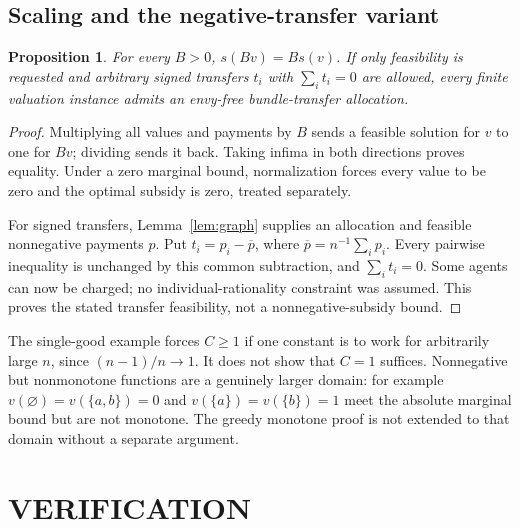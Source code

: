 \documentclass[11pt,a4paper]{article}
\newtheorem{proposition}[theorem]{Proposition}
\theoremstyle{remark}\newtheorem{remark}[theorem]{Remark}
\begin{document}
\subsection{Scaling and the negative-transfer variant}
\begin{proposition}\label{prop:scale}
For every $B>0$, $s(Bv)=B s(v)$. If only feasibility is requested and arbitrary signed transfers $t_i$ with $\sum_i t_i=0$ are allowed, every finite valuation instance admits an envy-free bundle-transfer allocation.
\end{proposition}
\begin{proof}
Multiplying all values and payments by $B$ sends a feasible solution for $v$ to one for $Bv$; dividing sends it back. Taking infima in both directions proves equality. Under a zero marginal bound, normalization forces every value to be zero and the optimal subsidy is zero, treated separately.

For signed transfers, Lemma~\ref{lem:graph} supplies an allocation and feasible nonnegative payments $p$. Put $t_i=p_i-\overline p$, where $\overline p=n^{-1}\sum_i p_i$. Every pairwise inequality is unchanged by this common subtraction, and $\sum_i t_i=0$. Some agents can now be charged; no individual-rationality constraint was assumed. This proves the stated transfer feasibility, not a nonnegative-subsidy bound.
\end{proof}
The single-good example forces $C\ge1$ if one constant is to work for arbitrarily large $n$, since $(n-1)/n\to1$. It does not show that $C=1$ suffices. Nonnegative but nonmonotone functions are a genuinely larger domain: for example $v(\varnothing)=v(\{a,b\})=0$ and $v(\{a\})=v(\{b\})=1$ meet the absolute marginal bound but are not monotone. The greedy monotone proof is not extended to that domain without a separate argument.

\section{VERIFICATION}
\end{document}
